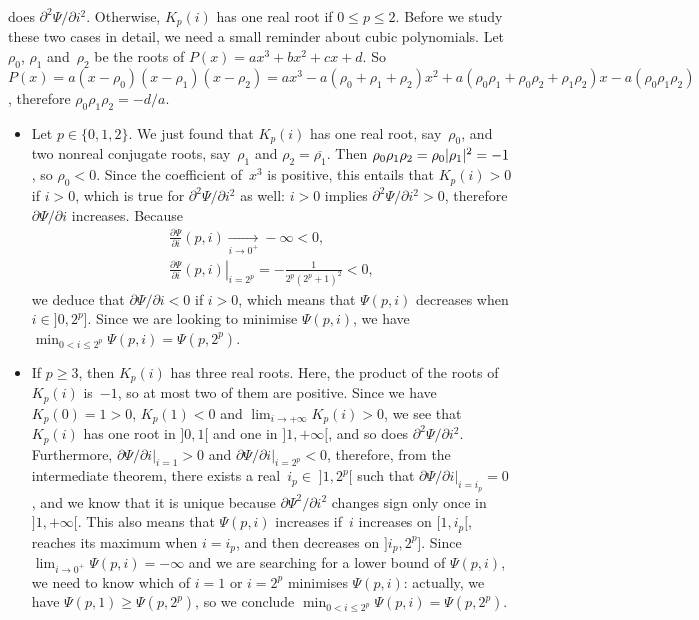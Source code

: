 does \(\partial^2\Psi/\partial i^2\). Otherwise, \(K_p(i)\) has one
real root if \(0 \leqslant p \leqslant 2\). Before we study these two
cases in detail, we need a small reminder about cubic polynomials. Let
\(\rho_0\), \(\rho_1\) and~\(\rho_2\) be the roots of \(P(x) = ax^3 +
bx^2 + cx + d\). So \(P(x) = a(x-\rho_0)(x-\rho_1)(x-\rho_2) = ax^3 -
a(\rho_0+\rho_1+\rho_2)x^2 + a(\rho_0\rho_1 + \rho_0\rho_2 + \rho_1
\rho_2)x - a(\rho_0\rho_1\rho_2)\), therefore \(\rho_0\rho_1\rho_2 =
-d/a\).
\begin{itemize}

\item Let \(p \in \{0,1,2\}\). We just found that \(K_p(i)\) has one
  real root, say~\(\rho_0\), and two nonreal conjugate roots,
  say~\(\rho_1\) and \(\rho_2=\overline{\rho_1}\). Then
  \(\rho_0\rho_1\rho_2 = \rho_0 \lvert{\rho_1}\rvert{}^2 = -1\), so \(\rho_0 <
  0\). Since the coefficient of~\(x^3\) is positive, this entails that
  \(K_p(i) > 0\) if \(i > 0\), which is true for
  \(\partial^2\Psi/\partial i^2\) as well: \(i > 0 \) implies
  \(\partial^2\Psi/\partial i^2 > 0\), therefore
  \(\partial\Psi/\partial i\) increases. Because
  \begin{gather*}
    \frac{\partial\Psi}{\partial i}(p,i) \xrightarrow[i\to 0^{+}]{}
    -\infty < 0,\\
    \left.\frac{\partial\Psi}{\partial
        i}(p,i)\right|_{i=2^p} = -\frac{1}{2^p(2^p+1)^2} < 0,
  \end{gather*}
  we deduce that \(\partial\Psi/\partial i < 0\) if \(i > 0\), which
  means that \(\Psi(p,i)\) decreases when \(i \in ]0,2^p]\). Since we
  are looking to minimise \(\Psi(p,i)\), we have \(\min_{0 < i
    \leqslant 2^p}\Psi(p,i) = \Psi(p,2^p)\).

\item If \(p \geqslant 3\), then \(K_p(i)\) has three real
  roots. Here, the product of the roots of \(K_p(i)\) is~\(-1\), so at
  most two of them are positive. Since we have \(K_p(0) = 1 > 0\),
  \(K_p(1) < 0\) and \(\lim_{i\to+\infty}K_p(i) > 0\), we see that
  \(K_p(i)\) has one root in \(]0,1[\) and one in \(]1,+\infty[\), and
  so does \(\partial^2\Psi/\partial i^2\). Furthermore,
  \(\left.\partial\Psi/\partial i\right|_{i=1} > 0\) and
  \(\left.\partial\Psi/\partial i\right|_{i=2^p} < 0\), therefore,
  from the intermediate theorem, there exists a real~\(i_p \in\;
  ]1,2^p[\) such that \(\left.\partial\Psi/\partial i\right|_{i=i_p} =
  0\), and we know that it is unique because \(\partial\Psi^2/\partial
  i^2\) changes sign only once in \(]1,+\infty[\). This also means
  that \(\Psi(p,i)\) increases if~\(i\) increases on \([1,i_p[\),
  reaches its maximum when \(i=i_p\), and then decreases on
  \(]i_p,2^p]\). Since \(\lim_{i \to 0^{+}}\Psi(p,i) = -\infty\) and
  we are searching for a lower bound of \(\Psi(p,i)\), we need to know
  which of \(i=1\) or \(i=2^p\) minimises \(\Psi(p,i)\): actually, we
  have \(\Psi(p,1) \geqslant \Psi(p,2^p)\), so we conclude \(\min_{0 <
    i \leqslant 2^p}\Psi(p,i) = \Psi(p,2^p)\).
\end{itemize}
